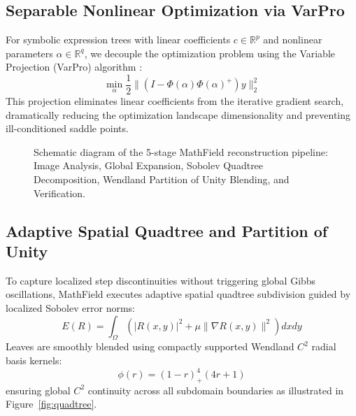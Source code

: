 \documentclass[11pt,a4paper]{article}
\begin{document}
\subsection{Separable Nonlinear Optimization via VarPro}
For symbolic expression trees with linear coefficients $c \in \mathbb{R}^p$ and nonlinear parameters $\alpha \in \mathbb{R}^q$, we decouple the optimization problem using the Variable Projection (VarPro) algorithm \cite{golub1973differentiation}:
\begin{equation}
\min_{\alpha} \frac{1}{2} \| (I - \Phi(\alpha) \Phi(\alpha)^+) y \|_2^2
\end{equation}
This projection eliminates linear coefficients from the iterative gradient search, dramatically reducing the optimization landscape dimensionality and preventing ill-conditioned saddle points.

\begin{figure}[htbp]
\centering
{}
\caption{Schematic diagram of the 5-stage MathField reconstruction pipeline: Image Analysis, Global Expansion, Sobolev Quadtree Decomposition, Wendland Partition of Unity Blending, and Verification.}
\label{fig:pipeline}
\end{figure}

\subsection{Adaptive Spatial Quadtree and Partition of Unity}
To capture localized step discontinuities without triggering global Gibbs oscillations, MathField executes adaptive spatial quadtree subdivision guided by localized Sobolev error norms:
\begin{equation}
E(R) = \int_{\Omega} \left( |R(x, y)|^2 + \mu \|\nabla R(x, y)\|^2 \right) dx dy
\end{equation}
Leaves are smoothly blended using compactly supported Wendland $C^2$ radial basis kernels:
\begin{equation}
\phi(r) = (1 - r)_+^4 (4r + 1)
\end{equation}
ensuring global $C^2$ continuity across all subdomain boundaries as illustrated in Figure~\ref{fig:quadtree}.
\end{document}
